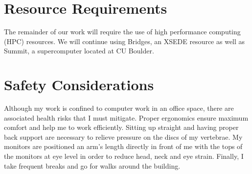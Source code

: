 \documentclass{article}
\begin{document}
  \section{Resource Requirements}\label{section:resources}
  
  The remainder of our work will require the use of high performance computing (HPC)
  resources. We will continue using Bridges, an XSEDE resource as well as Summit, a
  supercomputer located at CU Boulder.
  
  \section{Safety Considerations}\label{section:safety}
  
  Although my work is confined to computer work in an office space, there are 
  associated health risks that I must mitigate. Proper ergonomics ensure 
  maximum comfort and help me to work efficiently. Sitting up straight and
  having proper back support are necessary to relieve pressure on the discs
  of my vertebrae. My monitors are positioned an arm's length directly in 
  front of me with the tops of the monitors at eye level in order to reduce
  head, neck and eye strain. Finally, I take frequent breaks and go for 
  walks around the building.

  \newpage
  
  
\end{document}
